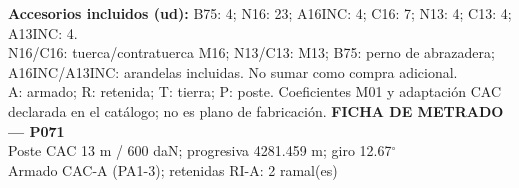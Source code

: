 \begingroup\scriptsize
\textbf{Accesorios incluidos (ud):} B75: 4; N16: 23; A16INC: 4; C16: 7; N13: 4; C13: 4; A13INC: 4.\\
N16/C16: tuerca/contratuerca M16; N13/C13: M13; B75: perno de abrazadera; A16INC/A13INC: arandelas incluidas. No sumar como compra adicional.\\
A: armado; R: retenida; T: tierra; P: poste. Coeficientes M01 y adaptación CAC declarada en el catálogo; no es plano de fabricación.
\endgroup\endgroup
\clearpage{}
\begingroup\small\setlength{\parskip}{3pt}\renewcommand{\arraystretch}{1.05}
\textbf{\large FICHA DE METRADO — P071}\\[4pt]
Poste CAC 13 m / 600 daN; progresiva 4281.459 m; giro 12.67\ensuremath{^\circ}\\
Armado CAC-A (PA1-3); retenidas RI-A: 2 ramal(es)\\
\begingroup\scriptsize
